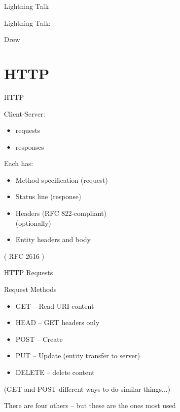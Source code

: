 \documentclass{beamer}
\begin{document}
\begin{frame}{Lightning Talk}

{\centering

\vfill
{\LARGE Lightning Talk:  }

\vfill
{\Huge Drew}

\vfill
}
\end{frame}


\section{HTTP}

\begin{frame}[fragile]{HTTP}

\vfill
{\Large Client-Server: }
\begin{itemize}
  \item requests
  \item responses
\end{itemize}

{\Large Each has:}

\begin{itemize}
  \item Method specification (request)
  \item Status line (response)
  \item  Headers (RFC 822-compliant)\\[0.1in]
  (optionally)
  \item Entity headers and body
\end{itemize}
 
\vfill
 ( RFC 2616 )

\end{frame} 

\begin{frame}{HTTP Requests}

{\Large Request Methods  }

\begin{itemize}
  \item GET  -- Read URI content
  \item HEAD -- GET headers only
  \item POST -- Create
  \item PUT  -- Update (entity transfer to server)
  \item DELETE  -- delete content
\end{itemize}
(GET and POST different ways to do similar things...)

\vfill
There are four others -- but these are the ones most used
\end{frame}
\end{document}

